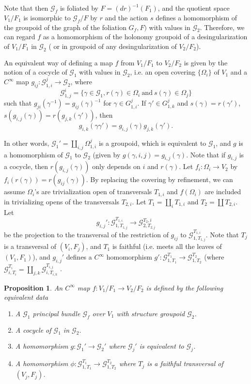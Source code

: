 \documentclass[12pt]{amsart}
\newtheorem{prop}[thm]{Proposition}
\theoremstyle{definition}
\theoremstyle{remark}
\numberwithin{equation}{section}
\newcommand{\CG}{{\mathcal G}}
\begin{document}
Note that then $\CG_f$ is foliated by $F=(dr)^{-1}(F_1)$, and the quotient space $V_1/F_1$ is isomorphic to $\CG_f/F$ by $r$ and the action $s$ defines a homomorphism of the groupoid of the graph of the foliation $G_f, F)$ with values in $\CG_2$. Therefore, we can regard $f$ as a homomorphism of the holonomy groupoid of a desingularization of $V_1/F_1$ in $\CG_2$ ( or in groupoid of any desingularization of $V_2/F_2$).

An equivalent way of defining a map $f$ from $V_1/F_1$ to $V_2/F_2$ is given by the notion of a cocycle of $\CG_1$ with values in $\CG_2$, i.e. an open covering $\{\Omega_i\}$   of $V_1$ and a $C^{\infty}$ map $g_{ij}: \CG_{1,i}^j \to \CG_2$, where
\begin{equation}
\CG_{1,j}^i=\{ \gamma\in \CG_1, r(\gamma)\in \Omega_i\ \text{and}\ s(\gamma)\in \Omega_j\}
\end{equation}
such that $g_{ji}(\gamma^{-1})=g_{ij}(\gamma)^{-1}$ for $\gamma\in G_{1,i}^j$. If $\gamma'\in  G_{1,k}^j$ and $s(\gamma)=r(\gamma')$, $s(g_{i,j}(\gamma))=r(g_{j,k}(\gamma'))$, then  
\begin{equation}
g_{i,k}(\gamma\gamma')=g_{i,j}(\gamma)g_{j,k}(\gamma').
\end{equation}

In other words, $\CG_1'=\coprod_{i,j}\Omega_{1,i}^j$ is a groupoid, which is equivalent to $\CG_1$, and $g$ is a homomorphism of $\CG_1$ to $\CG_2$ (given by $g(\gamma, i , j) = g_{i, j} (\gamma)$. Note that if $g_{i,j}$ is a cocycle, then $r(g_{i,j}(\gamma))$ only depends on $i$ and $r(\gamma)$. Let $f_i:\Omega_i \to V_2$ by $f_i(r(\gamma))=r(g_{ij}(\gamma))$.  By replacing the covering by refinement, we can assume $\Omega_i$'s  are  trivialization open  of transversals $T_{1,i}$ and $f(\Omega_i)$ are included in trivializing opens of the  transversals $T_{2,i}$. Let $T_1=\coprod_i T_{1,i}$ and $T_2=\coprod T_{2,i}$. Let
\begin{equation}
g_{i,j}': \CG_{1,T_{1,j}}^{T_{1,i}}\to \CG_{2,T_{2,j}}^{T{_2,i}}
\end{equation}
be the projection to the transversal of the restriction of $g_{ij}$ to $\CG_{1,T_{1,j}}^{T_{1,i}}$. Note that $T_j$ is a transversal of $(V_i,F_j)$, and $T_1$ is faithful (i.e. meets all the leaves of $(V_1,F_1)$), and $g_{i,j}' $ defines a $C^{\infty}$ homomorphism $g': \CG_{1,T_1}^{T_1}\to \CG_{1,T_2}^{T_2}$ (where $\CG_{i,T_i}^{T_i} = \coprod_{j, k} \CG_{i,T_{i,k}}^{T_{i, j}}$ . 
\begin{prop}
	An $C^{\infty}$ map $f:V_1/F_1 \to V_2/F_2$ is defined by the following equivalent data
	\begin{enumerate}
		\item A $\CG_1$ principal bundle  $\CG_f$ over $V_1$ with structure groupoid $\CG_2$.
		\item A cocycle of $\CG_1$ in $\CG_2$.
		\item A homomorphism $g:\CG_1' \to \CG_2'$ where $\CG_j'$ is equivalent to $\CG_j$.
		\item A homomorphism $\phi:  \CG_{1,T_1}^{T_1}\to \CG_{1,T_2}^{T_2}$ where $T_j$ is a faithful transversal of $(V_j,F_j)$.
	\end{enumerate}
\end{prop}
\end{document}
